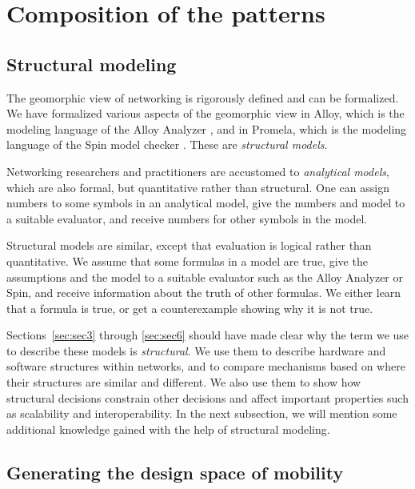 \section{Composition of the patterns}
\label{sec:sec7}

\subsection{Structural modeling}
\label{sec:structural}

The geomorphic view of networking is rigorously defined and can
be formalized.
We have formalized various aspects of the geomorphic view in
Alloy, which is the modeling language of the Alloy 
Analyzer \cite{alloy-book},
and in Promela, which is the modeling language of the Spin model
checker \cite{Spin}.
These are {\it structural models}.

Networking researchers and practitioners are accustomed to {\it analytical models},
which are also formal, but quantitative rather than structural.
One can assign numbers to some symbols in an analytical model,
give the numbers and model to a suitable evaluator, and receive
numbers for other symbols in the model.

Structural models are similar, 
except that evaluation is logical rather than quantitative.
We assume that some formulas in a model are true,
give the assumptions and the model to a suitable evaluator such
as the Alloy Analyzer or Spin,
and receive information about the truth of other formulas.
We either learn that a formula is true, or get a counterexample
showing why it is not true.

Sections~\ref{sec:sec3} through \ref{sec:sec6} should have made
clear why the term we use to describe these models is
{\it structural}.
We use them to describe hardware and software structures within
networks,
and to compare mechanisms based on where their structures are
similar and different.
We also use them to show how structural decisions constrain other
decisions and affect important properties such as scalability
and interoperability.
In the next subsection, we will mention some additional knowledge
gained with the help of structural modeling. 

\subsection{Generating the design space of mobility}
\label{sec:design}

